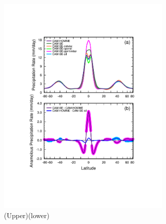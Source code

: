 \begin{figure}[h]
\centering
\includegraphics[width=20pc]{figs/dzonal_prect.pdf}
\caption{(Upper)(lower)}
\label{fig:dzonal}
\end{figure}

